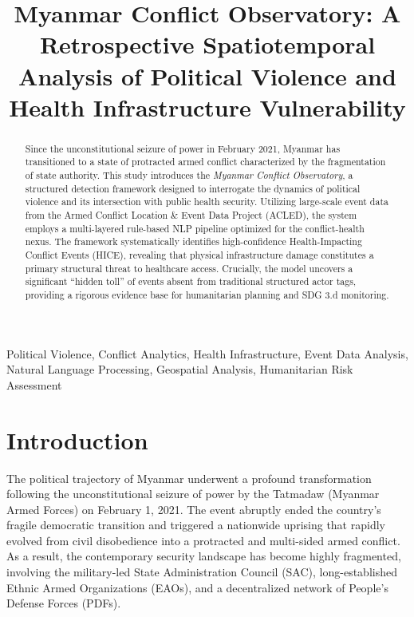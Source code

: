 \documentclass[conference]{IEEEtran}
\title{Myanmar Conflict Observatory: A Retrospective Spatiotemporal Analysis of Political Violence and Health Infrastructure Vulnerability}
\author{
    \IEEEauthorblockN{Tain Yan Tun}
    \IEEEauthorblockA{
        \textit{Faculty of Information Technology} \\
        \textit{Asia Pacific International University} \\
        Computational Data Science \\
        Saraburi, Thailand \\
    }
}
\begin{document}
\maketitle

\begin{abstract}
    Since the unconstitutional seizure of power in February 2021, Myanmar has transitioned to a state of protracted armed conflict characterized by the fragmentation of state authority. This study introduces the \textit{Myanmar Conflict Observatory}, a structured detection framework designed to interrogate the dynamics of political violence and its intersection with public health security. Utilizing large-scale event data from the Armed Conflict Location \& Event Data Project (ACLED), the system employs a multi-layered rule-based NLP pipeline optimized for the conflict-health nexus. The framework systematically identifies high-confidence Health-Impacting Conflict Events (HICE), revealing that physical infrastructure damage constitutes a primary structural threat to healthcare access. Crucially, the model uncovers a significant ``hidden toll'' of events absent from traditional structured actor tags, providing a rigorous evidence base for humanitarian planning and SDG 3.d monitoring.
\end{abstract}

\begin{IEEEkeywords}
    Political Violence, Conflict Analytics, Health Infrastructure, Event Data Analysis, Natural Language Processing, Geospatial Analysis, Humanitarian Risk Assessment
\end{IEEEkeywords}

\section{Introduction}

The political trajectory of Myanmar underwent a profound transformation following the unconstitutional seizure of power by the Tatmadaw (Myanmar Armed Forces) on February 1, 2021\cite{fumagalli2022myanmar}. The event abruptly ended the country’s fragile democratic transition and triggered a nationwide uprising that rapidly evolved from civil disobedience into a protracted and multi-sided armed conflict.  As a result, the contemporary security landscape has become highly fragmented, involving the military-led State Administration Council (SAC), long-established Ethnic Armed Organizations (EAOs), and a decentralized network of People’s Defense Forces (PDFs).
\end{document}
